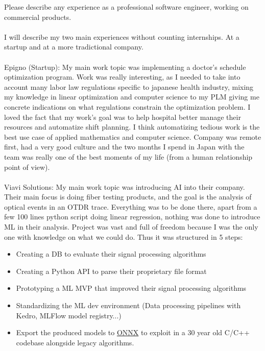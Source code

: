 \documentclass{exam}
\begin{document}
\begin{questions}

\question Please describe any experience as a professional software engineer, working on commercial products.
\\~\\
I will describe my two main experiences without counting internships. At a startup and at a more tradictional company. \\~\\
Epigno (Startup): My main work topic was implementing a doctor’s schedule optimization program. Work was really interesting, as 
I needed to take into account many labor law regulations specific to japanese health industry, mixing my knowledge in linear optimization and computer science
to my PLM giving me concrete indications on what regulations constrain the optimization problem. I loved the fact that my work's goal 
was to help hospital better manage their resources and automatize shift planning. 
I think automatizing tedious work is the best use case of applied mathematics and computer science.
Company was remote first, had a very good culture and the two months I spend in Japan with the team was really one of the best moments of my life (from a human relationship point of view).
\\~\\
Viavi Solutions:
My main work topic was introducing AI into their company. Their main focus is doing fiber testing products, and the goal 
is the analysis of optical events in an OTDR trace. Everything was to be done there, apart from a few 100 lines python script doing linear regression, nothing was done to introduce ML in their analysis.
Project was vast and full of freedom because I was the only one with knowledge on what we could do.
Thus it was structured in 5 steps:
\begin{itemize}
\item Creating a DB to evaluate their signal processing algorithms
\item Creating a Python API to parse their proprietary file format
\item Prototyping a ML MVP that improved their signal processing algorithms
\item Standardizing the ML dev environment (Data processing pipelines with Kedro, MLFlow model registry...)
\item Export the produced models to \href{https://fr.wikipedia.org/wiki/Open_Neural_Network_Exchange}{ONNX} to exploit in a 30 year old C/C++ codebase alongside legacy algorithms.

\end{itemize}
\end{questions}
\end{document}

